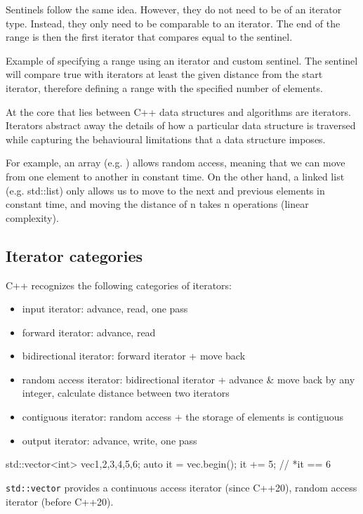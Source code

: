 Sentinels follow the same idea. However, they do not need to be of an iterator type. Instead, they only need to be comparable to an iterator. The end of the range is then the first iterator that compares equal to the sentinel.

Example of specifying a range using an iterator and custom sentinel. The sentinel will compare true with iterators at least the given distance from the start iterator, therefore defining a range with the specified number of elements.


At the core that lies between C++ data structures and algorithms are iterators. Iterators abstract away the details of how a particular data structure is traversed while capturing the behavioural limitations that a data structure imposes.

For example, an array (e.g. \emph{}) allows random access, meaning that we can move from one element to another in constant time. On the other hand, a linked list (e.g. std::list) only allows us to move to the next and previous elements in constant time, and moving the distance of n takes n operations (linear complexity).

\subsection{Iterator categories}

C++ recognizes the following categories of iterators:

\begin{itemize}
    \item \gls{input iterator}: advance, read, one pass
    \item \gls{forward iterator}: advance, read
    \item \gls{bidirectional iterator}: forward iterator + move back
    \item \gls{random access iterator}: bidirectional iterator + advance \& move back by any integer, calculate distance between two iterators
    \item \gls{contiguous iterator}: random access + the storage of elements is contiguous
    \item \gls{output iterator}: advance, write, one pass
\end{itemize}

\begin{box-note}
\begin{cppcode}
std::vector<int> vec{1,2,3,4,5,6};
auto it = vec.begin();
it += 5; // *it == 6
\end{cppcode}
\noindent\small\texttt{std::vector} provides a continuous access iterator (since C++20), random access iterator (before C++20).
\end{box-note}

